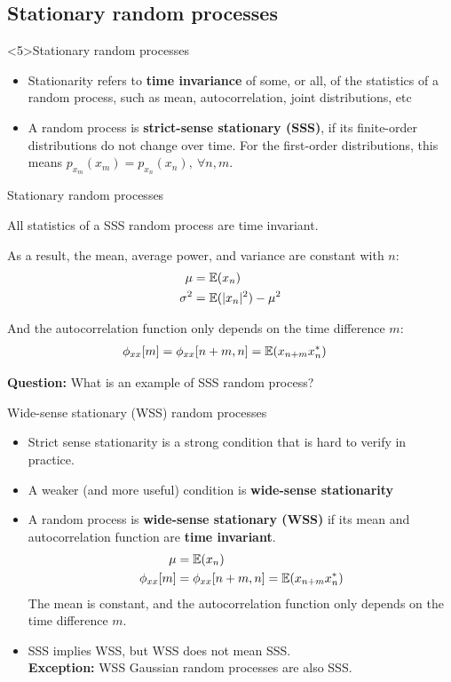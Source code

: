 \documentclass[10pt]{beamer}
\begin{document}
\subsection{Stationary random processes}
\begin{frame}<5>{Stationary random processes}
\begin{itemize}
	\item Stationarity refers to \textbf{time invariance} of some, or all, of the statistics of a random process, such as mean, autocorrelation, joint distributions, etc
	\item A random process is \textbf{strict-sense stationary (SSS)}, if its finite-order distributions do not change over time. For the first-order distributions, this means $p_{x_m}(x_m) = p_{x_n}(x_n),~\forall n, m$.
\end{itemize}
 
\centering
\resizebox{0.7\linewidth}{!}{}
\end{frame}

\begin{frame}{Stationary random processes}

All statistics of a SSS random process are time invariant. 

As a result, the mean, average power, and variance are constant with $n$:
\begin{align*}
\mu &= \operatorname{\mathbb{E}}(x_n) \\
\sigma^2 &= \operatorname{\mathbb{E}}(|x_n|^2) - \mu^2
\end{align*}

And the autocorrelation function only depends on the time difference $m$:
\begin{align*}
\phi_{xx}[m] &= \phi_{xx}[n+m, n] = \operatorname{\mathbb{E}}(x_{n+m}x_n^*)
\end{align*}

\textbf{Question:} What is an example of SSS random process?

\end{frame}

\begin{frame}{Wide-sense stationary (WSS) random processes}

\begin{itemize}
	\item Strict sense stationarity is a strong condition that is hard to verify in practice.
	\pause\item A weaker (and more useful) condition is \textbf{wide-sense stationarity}
	\pause\item A random process is \textbf{wide-sense stationary (WSS)} if its mean and autocorrelation function are \textbf{time invariant}. 
	\begin{align*}
	\mu &= \operatorname{\mathbb{E}}(x_n) \\
	\phi_{xx}[m] &= \phi_{xx}[n+m, n] = \operatorname{\mathbb{E}}(x_{n+m}x_n^*)
	\end{align*}
	The mean is constant, and the autocorrelation function only depends on the time difference $m$.
	\pause\item SSS implies WSS, but WSS does not mean SSS. \\
	\textbf{Exception:} WSS Gaussian random processes are also SSS.	
\end{itemize}
\end{frame}
\end{document}

